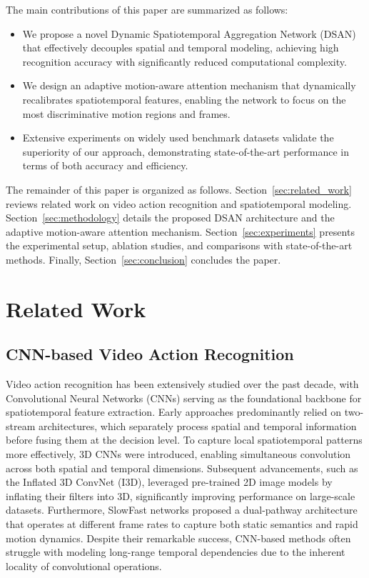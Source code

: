 \documentclass[lettersize,journal]{IEEEtran}
\begin{document}
The main contributions of this paper are summarized as follows:
\begin{itemize}
    \item We propose a novel Dynamic Spatiotemporal Aggregation Network (DSAN) that effectively decouples spatial and temporal modeling, achieving high recognition accuracy with significantly reduced computational complexity.
    \item We design an adaptive motion-aware attention mechanism that dynamically recalibrates spatiotemporal features, enabling the network to focus on the most discriminative motion regions and frames.
    \item Extensive experiments on widely used benchmark datasets validate the superiority of our approach, demonstrating state-of-the-art performance in terms of both accuracy and efficiency.
\end{itemize}

The remainder of this paper is organized as follows. Section~\ref{sec:related_work} reviews related work on video action recognition and spatiotemporal modeling. Section~\ref{sec:methodology} details the proposed DSAN architecture and the adaptive motion-aware attention mechanism. Section~\ref{sec:experiments} presents the experimental setup, ablation studies, and comparisons with state-of-the-art methods. Finally, Section~\ref{sec:conclusion} concludes the paper.

\section{Related Work}

\subsection{CNN-based Video Action Recognition}
Video action recognition has been extensively studied over the past decade, with Convolutional Neural Networks (CNNs) serving as the foundational backbone for spatiotemporal feature extraction. Early approaches predominantly relied on two-stream architectures, which separately process spatial and temporal information before fusing them at the decision level. To capture local spatiotemporal patterns more effectively, 3D CNNs were introduced, enabling simultaneous convolution across both spatial and temporal dimensions. Subsequent advancements, such as the Inflated 3D ConvNet (I3D), leveraged pre-trained 2D image models by inflating their filters into 3D, significantly improving performance on large-scale datasets. Furthermore, SlowFast networks proposed a dual-pathway architecture that operates at different frame rates to capture both static semantics and rapid motion dynamics. Despite their remarkable success, CNN-based methods often struggle with modeling long-range temporal dependencies due to the inherent locality of convolutional operations.
\end{document}
